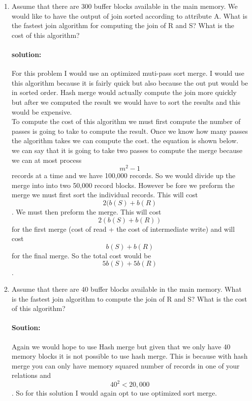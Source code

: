 \documentclass[11pt]{article}
\begin{document}
\begin{enumerate}
\item Assume that there are 300 buffer blocks available in the main memory. 
We would like to have the output of join sorted according to attribute A. 
What is the fastest join algorithm for computing the join of R and S? What is the cost of this algorithm? 

\paragraph{solution:} \hfill \break
For this problem I would use an optimized muti-pass sort merge. I would use this algorithm because it is fairly quick but also because the out put would be in sorted order. Hash merge would actually compute the join more quickly but after we computed the result we would have to sort the results and this would be expensive.\\

To compute the cost of this algorithm we must first compute the number of passes is going to take to compute the result. Once we know how many passes the algorithm takes we can compute the cost. the equation is shown below.\\
we can say that it is going to take two passes to compute the merge because we can at most process \[m^2 - 1\] records at a time and we have 100,000 records. So we would divide up the merge into into two 50,000 record blocks. However be fore we preform the merge we must first sort the individual records. This will cost \[2(b(S) + b(R)\]. We must then preform the merge. This will cost \[2(b(S) + b(R))\] for the first merge (cost of read + the cost of intermediate write) and will cost \[b(S) + b(R)\] for the final merge. So the total cost would be \[5 b(S) + 5 b(R)\].\\


\item Assume that there are 40 buffer blocks available in the main memory. 
What is the fastest join algorithm to compute the join of R and S? What is the cost of this algorithm? \\

\paragraph{Soution:} \hfill \break
Again we would hope to use Hash merge but given that we only have 40 memory blocks it is not possible to use hash merge. This is because with hash merge you can only have memory squared number of records in one of your relations and \[40^2 < 20,000\]. So for this solution I would again opt to use optimized sort merge.\\


\end{enumerate}
\end{document}
